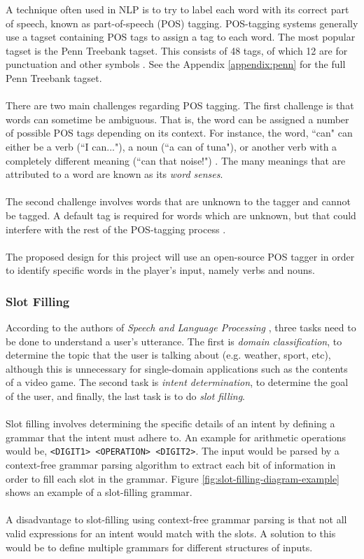 \documentclass[11pt]{article}
\begin{document}
A technique often used in NLP is to try to label each word with its correct part of speech, known as part-of-speech (POS) tagging. POS-tagging systems generally use a tagset containing POS tags to assign a tag to each word. The most popular tagset is the Penn Treebank tagset. This consists of 48 tags, of which 12 are for punctuation and other symbols \cite{RefWorks:41}. See the Appendix \ref{appendix:penn} for the full Penn Treebank tagset.
\\
\\
There are two main challenges regarding POS tagging. The first challenge is that words can sometime be ambiguous. That is, the word can be assigned a number of possible POS tags depending on its context. For instance, the word, ``can" can either be a verb (``I can..."), a noun (``a can of tuna"), or another verb with a completely different meaning (``can that noise!") \cite{RefWorks:43}. The many meanings that are attributed to a word are known as its \textit{word senses}.
\\
\\
The second challenge involves words that are unknown to the tagger and cannot be tagged. A default tag is required for words which are unknown, but that could interfere with the rest of the POS-tagging process \cite{RefWorks:41}.
\\
\\
The proposed design for this project will use an open-source POS tagger in order to identify specific words in the player's input, namely verbs and nouns.

\subsubsection{Slot Filling}

According to the authors of \textit{Speech and Language Processing} \cite{RefWorks:107}, three tasks need to be done to understand a user's utterance. The first is \textit{domain classification}, to determine the topic that the user is talking about (e.g. weather, sport, etc), although this is unnecessary for single-domain applications such as the contents of a video game. The second task is \textit{intent determination}, to determine the goal of the user, and finally, the last task is to do \textit{slot filling}.
\\
\\
Slot filling involves determining the specific details of an intent by defining a grammar that the intent must adhere to. An example for arithmetic operations would be, \texttt{<DIGIT1> <OPERATION> <DIGIT2>}. The input would be parsed by a context-free grammar parsing algorithm to extract each bit of information in order to fill each slot in the grammar. Figure \ref{fig:slot-filling-diagram-example} shows an example of a slot-filling grammar.
\\
\\
A disadvantage to slot-filling using context-free grammar parsing is that not all valid expressions for an intent would match with the slots. A solution to this would be to define multiple grammars for different structures of inputs.
\end{document}
